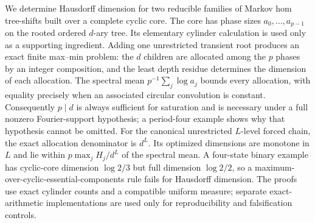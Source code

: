 We determine Hausdorff dimension for two reducible families of Markov hom
tree-shifts built over a complete cyclic core.  The core has phase sizes
$a_0,\ldots,a_{p-1}$ on the rooted ordered $d$-ary tree.  Its elementary
cylinder calculation is used only as a supporting ingredient.  Adding one
unrestricted transient root produces an exact finite max--min problem: the
$d$ children are allocated among the $p$ phases by an integer composition,
and the least depth residue determines the dimension of each allocation.
The spectral mean $p^{-1}\sum_j\log a_j$ bounds every allocation, with
equality precisely when an associated circular convolution is constant.
Consequently $p\mid d$ is always sufficient for saturation and is necessary
under a full nonzero Fourier-support hypothesis; a period-four example shows
why that hypothesis cannot be omitted.  For the canonical unrestricted
$L$-level forced chain, the exact allocation denominator is $d^L$.  Its
optimized dimensions are monotone in $L$ and lie within
$p\max_j H_j/d^L$ of the spectral mean.  A four-state binary example has
cyclic-core dimension $\log 2/3$ but full dimension $\log 2/2$, so a
maximum-over-cyclic-essential-components rule fails for Hausdorff dimension.  The
proofs use exact cylinder counts and a compatible uniform measure; separate
exact-arithmetic implementations are used only for reproducibility and
falsification controls.
